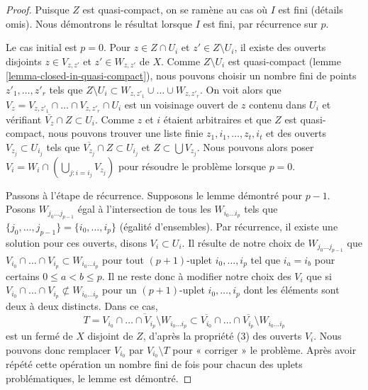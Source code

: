 \begin{proof}
Puisque $Z$ est quasi-compact, on se ramène au cas où $I$ est fini (détails
omis). Nous démontrons le résultat lorsque $I$ est fini, par récurrence sur
$p$.

\medskip\noindent
Le cas initial est $p = 0$.
Pour $z \in Z \cap U_i$ et $z' \in Z \setminus U_i$, il existe des ouverts
disjoints $z \in V_{z, z'}$ et $z' \in W_{z, z'}$ de $X$.
Comme $Z \setminus U_i$ est quasi-compact
(lemme \ref{lemma-closed-in-quasi-compact}), nous pouvons choisir un nombre
fini de points $z'_1, \ldots, z'_r$ tels que
$Z \setminus U_i \subset W_{z, z'_1} \cup \ldots \cup W_{z, z'_r}$.
On voit alors que
$V_z = V_{z, z'_1} \cap \ldots \cap V_{z, z'_r} \cap U_i$
est un voisinage ouvert de $z$ contenu dans $U_i$ et vérifiant
$\overline{V_z} \cap Z \subset U_i$.
Comme $z$ et $i$ étaient arbitraires et que $Z$ est quasi-compact, nous
pouvons trouver une liste finie $z_1, i_1, \ldots, z_t, i_t$ et des ouverts
$V_{z_j} \subset U_{i_j}$ tels que
$\overline{V_{z_j}} \cap Z \subset U_{i_j}$
et $Z \subset \bigcup V_{z_j}$.
Nous pouvons alors poser $V_i = W_i \cap (\bigcup_{j : i = i_j} V_{z_j})$
pour résoudre le problème lorsque $p = 0$.

\medskip\noindent
Passons à l'étape de récurrence. Supposons le lemme démontré pour $p - 1$.
Posons $W_{j_0 \ldots j_{p - 1}}$ égal à l'intersection de tous les
$W_{i_0 \ldots i_p}$ tels que
$\{j_0, \ldots, j_{p - 1}\} = \{i_0, \ldots, i_p\}$ (égalité d'ensembles).
Par récurrence, il existe une solution pour ces ouverts, disons
$V_i \subset U_i$.
Il résulte de notre choix de $W_{j_0 \ldots j_{p - 1}}$ que
$V_{i_0} \cap \ldots \cap V_{i_p} \subset W_{i_0 \ldots i_p}$
pour tout $(p + 1)$-uplet $i_0, \ldots, i_p$ tel que $i_a = i_b$ pour
certains $0 \leq a < b \leq p$.
Il ne reste donc à modifier notre choix des $V_i$ que si
$V_{i_0} \cap \ldots \cap V_{i_p} \not \subset W_{i_0 \ldots i_p}$
pour un $(p + 1)$-uplet $i_0, \ldots, i_p$ dont les éléments sont deux à
deux distincts. Dans ce cas,
$$
T =
\overline{V_{i_0} \cap \ldots \cap V_{i_p} \setminus W_{i_0 \ldots i_p}}
\subset
\overline{V_{i_0}} \cap \ldots \cap \overline{V_{i_p}} \setminus
W_{i_0 \ldots i_p}
$$
est un fermé de $X$ disjoint de $Z$, d'après la propriété (3) des ouverts
$V_i$. Nous pouvons donc remplacer $V_{i_0}$ par $V_{i_0} \setminus T$ pour
« corriger » le problème. Après avoir répété cette opération un nombre fini
de fois pour chacun des uplets problématiques, le lemme est démontré.
\end{proof}







